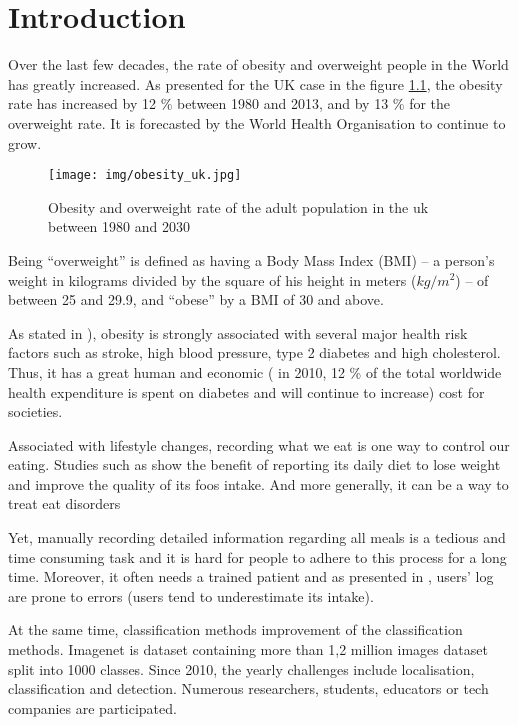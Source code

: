 \chapter{Introduction}

Over the last few decades, the rate of obesity and overweight people in the World has greatly increased. As presented for the UK case in the figure \ref{fig:obesity_uk}, the obesity rate has increased by 12 \% between 1980 and 2013, and by 13 \% for the overweight rate. It is forecasted by the World Health Organisation to continue to grow.

\begin{figure}[h]
    \centering
    \texttt{[image: img/obesity\_uk.jpg]}
    \caption[Obesity and overweight rate of the adult population in the uk between 1980 and 2030. \textit{Source: World Health Organisation}]{Obesity and overweight rate of the adult population in the uk between 1980 and 2030}
    \label{fig:obesity_uk}
\end{figure}

Being \enquote{overweight} is defined as having a Body Mass Index (BMI) – a person's weight in kilograms divided by the square of his height in meters ($ kg / m^2 $) – of between 25 and 29.9, and \enquote{obese} by a BMI of 30 and above.

As stated in \cite{Mokdad2003}), obesity is strongly associated with several major health risk factors such as stroke, high blood pressure, type 2 diabetes and high cholesterol. Thus, it has a great human and economic (\cite{Zhang2010} in 2010, 12 \% of the total worldwide health expenditure is spent on diabetes and will continue to increase) cost for societies.

Associated with lifestyle changes, recording what we eat is one way to control our eating. Studies such as \cite{Burke2011a} show the benefit of reporting its daily diet to lose weight and improve the quality of its foos intake. And more generally, it can be a way to treat eat disorders

Yet, manually recording detailed information regarding all meals is a tedious and time consuming task and it is hard for people to adhere to this process for a long time. Moreover, it often needs a trained patient and as presented in \cite{Lichtman1992}, users' log are prone to errors (users tend to underestimate its intake).

At the same time, classification methods improvement of the classification methods. Imagenet is dataset containing more than 1,2 million images dataset split into 1000 classes. Since 2010, the yearly challenges include localisation, classification and detection. Numerous researchers, students, educators or tech companies are participated.

